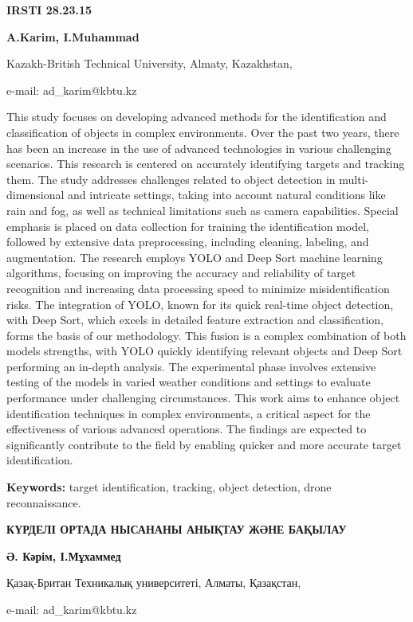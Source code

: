 \newpage
{\bfseries IRSTI 28.23.15}


\begin{center}
{\bfseries A.Karim, I.Muhammad}

Kazakh-British Technical University, Almaty, Kazakhstan,

e-mail: ad\_karim@kbtu.kz
\end{center}

This study focuses on developing advanced methods for the identification
and classification of objects in complex environments. Over the past two
years, there has been an increase in the use of advanced technologies in
various challenging scenarios. This research is centered on accurately
identifying targets and tracking them. The study addresses challenges
related to object detection in multi-dimensional and intricate settings,
taking into account natural conditions like rain and fog, as well as
technical limitations such as camera capabilities. Special emphasis is
placed on data collection for training the identification model,
followed by extensive data preprocessing, including cleaning, labeling,
and augmentation. The research employs YOLO and Deep Sort machine
learning algorithms, focusing on improving the accuracy and reliability
of target recognition and increasing data processing speed to minimize
misidentification risks. The integration of YOLO, known for its quick
real-time object detection, with Deep Sort, which excels in detailed
feature extraction and classification, forms the basis of our
methodology. This fusion is a complex combination of both
models\textquotesingle{} strengths, with YOLO quickly identifying
relevant objects and Deep Sort performing an in-depth analysis. The
experimental phase involves extensive testing of the models in varied
weather conditions and settings to evaluate performance under
challenging circumstances. This work aims to enhance object
identification techniques in complex environments, a critical aspect for
the effectiveness of various advanced operations. The findings are
expected to significantly contribute to the field by enabling quicker
and more accurate target identification.

{\bfseries Keywords:} target identification, tracking, object detection,
drone reconnaissance.

\begin{center}
{\large\bfseries КҮРДЕЛІ ОРТАДА НЫСАНАНЫ АНЫҚТАУ ЖӘНЕ БАҚЫЛАУ}

{\bfseries Ә. Кәрім, І.Мұхаммед}

Қазақ-Британ Техникалық университеті, Алматы, Қазақстан,

e-mail: ad\_karim@kbtu.kz
\end{center}

